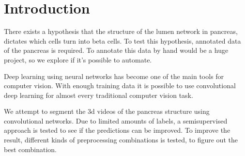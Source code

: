 \section{Introduction}\label{section:introduction}
There exists a hypothesis that the structure of the lumen network in pancreas, dictates which cells turn into beta cells.
To test this hypothesis, annotated data of the pancreas is required.
To annotate this data by hand would be a huge project, so we explore if it's possible to automate.

Deep learning using neural networks has become one of the main tools for computer vision.
With enough training data it is possible to use convolutional deep learning for almost every traditional computer vision task.

We attempt to segment the 3d videos of the pancreas structure using convolutional networks.
Due to limited amounts of labels, a semisupervised approach is tested to see if the predictions can be improved.
To improve the result, different kinds of preprocessing combinations is tested, to figure out the best combination.